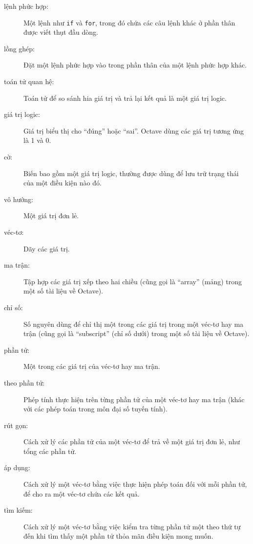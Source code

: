 \documentclass[12pt]{book}
\begin{document}
\begin{description}

\item[lệnh phức hợp:] Một lệnh như {\tt if} và {\tt for}, trong đó
chứa các câu lệnh khác ở phần thân được viết thụt đầu dòng.

\item[lồng ghép:] Đặt một lệnh phức hợp vào trong phần thân của một
lệnh phức hợp khác.

\item[toán tử quan hệ:] Toán tử để so sánh hia giá trị và trả lại
kết quả là một giá trị logic.

\item[giá trị logic:] Giá trị biểu thị cho ``đúng'' hoặc
``sai''.  Octave dùng các giá trị tương ứng là 1 và 0.

\item[cờ:] Biến bao gồm một giá trị logic, thường được dùng để lưu trữ
trạng thái của một điều kiện nào đó.

\item[vô hướng:] Một giá trị đơn lẻ.

\item[véc-tơ:] Dãy các giá trị.

\item[ma trận:] Tập hợp các giá trị xếp theo hai chiều (cũng gọi là
``array'' (mảng) trong một số tài liệu về Octave).

\item[chỉ số:] Số nguyên dùng để chỉ thị một trong các giá trị trong
một véc-tơ hay ma trận (cũng gọi là ``subscript'' (chỉ số dưới) trong
một số tài liệu về Octave).

\item[phần tử:] Một trong các giá trị của véc-tơ hay ma trận.

\item[theo phần tử:] Phép tính thực hiện trên từng phần tử của một
véc-tơ hay ma trận (khác với các phép toán trong môn đại số tuyến tính).

\item[rút gọn:] Cách xử lý các phần tử của một véc-tơ để trả về một
giá trị đơn lẻ, như tổng các phần tử.

\item[áp dụng:] Cách xử lý một véc-tơ bằng việc thực hiện phép
toán đối với mỗi phần tử, để cho ra một véc-tơ chứa các kết quả.

\item[tìm kiếm:] Cách xử lý một véc-tơ bằng việc kiểm tra từng phần tử
một theo thứ tự đến khi tìm thấy một phần tử thỏa mãn điều kiện mong muốn.

\end{description}
\end{document}
